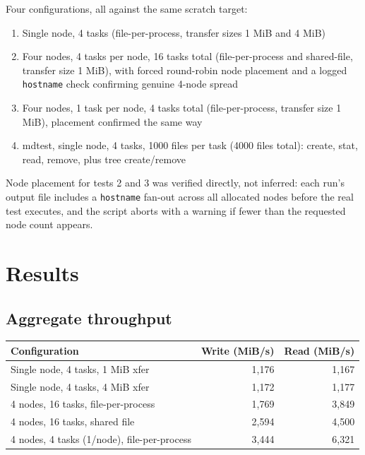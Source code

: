 \documentclass[11pt]{article}
\begin{document}
Four configurations, all against the same scratch target:

\begin{enumerate}
\item Single node, 4 tasks (file-per-process, transfer sizes 1 MiB and 4 MiB)
\item Four nodes, 4 tasks per node, 16 tasks total (file-per-process and shared-file, transfer size 1 MiB), with forced round-robin node placement and a logged \texttt{hostname} check confirming genuine 4-node spread
\item Four nodes, 1 task per node, 4 tasks total (file-per-process, transfer size 1 MiB), placement confirmed the same way
\item mdtest, single node, 4 tasks, 1000 files per task (4000 files total): create, stat, read, remove, plus tree create/remove
\end{enumerate}

Node placement for tests 2 and 3 was verified directly, not inferred: each run's output file includes a \texttt{hostname} fan-out across all allocated nodes before the real test executes, and the script aborts with a warning if fewer than the requested node count appears.

\section*{Results}

\subsection*{Aggregate throughput}

\begin{center}
\begin{tabular}{lrr}
\toprule
Configuration & Write (MiB/s) & Read (MiB/s) \\
\midrule
Single node, 4 tasks, 1 MiB xfer & 1{,}176 & 1{,}167 \\
Single node, 4 tasks, 4 MiB xfer & 1{,}172 & 1{,}177 \\
4 nodes, 16 tasks, file-per-process & 1{,}769 & 3{,}849 \\
4 nodes, 16 tasks, shared file & 2{,}594 & 4{,}500 \\
4 nodes, 4 tasks (1/node), file-per-process & 3{,}444 & 6{,}321 \\
\bottomrule
\end{tabular}
\end{center}
\end{document}
